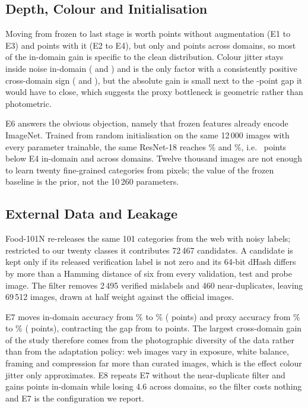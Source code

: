 \subsection{Depth, Colour and Initialisation}
Moving from frozen to last stage is worth \gainFinetuneNoaug{} points without
augmentation (E1 to E3) and \gainFinetuneAug{} points with it (E2 to E4), but
only \gainCanFinetuneNoaug{} and \gainCanFinetuneAug{} points across domains, so
most of the in-domain gain is specific to the clean distribution. Colour jitter
stays inside noise in-domain (\gainAugFrozen{} and \gainAugFinetune) and is the
only factor with a consistently positive cross-domain sign (\gainCanAugFrozen{}
and \gainCanAugFinetune), but the absolute gain is small next to the
\gapFour-point gap it would have to close, which suggests the proxy bottleneck is
geometric rather than photometric.

E6 answers the obvious objection, namely that frozen features already encode
ImageNet. Trained from random initialisation on the same 12\,000 images with every
parameter trainable, the same ResNet-18 reaches \accTestSix\% and \accCanSix\%,
i.e.\ \scratchDrop{} points below E4 in-domain and \scratchDropCan{} across
domains. Twelve thousand images are not enough to learn twenty fine-grained
categories from pixels; the value of the frozen baseline is the prior, not the
10\,260 parameters.

\subsection{External Data and Leakage}
Food-101N \cite{lee2018cleannet} re-releases the same 101 categories from the web
with noisy labels; restricted to our twenty classes it contributes 72\,467
candidates. A candidate is kept only if its released verification label is not
zero and its 64-bit dHash differs by more than a Hamming distance of six from
every validation, test and probe image. The filter removes 2\,495 verified
mislabels and 460 near-duplicates, leaving 69\,512 images, drawn at half weight
against the official images.

E7 moves in-domain accuracy from \accTestFour\% to \accTestSeven\%
(\gainExternal{} points) and proxy accuracy from \accCanFour\% to \accCanSeven\%
(\gainCanExternal{} points), contracting the gap from \gapFour{} to \gapSeven{}
points. The largest cross-domain gain of the study therefore comes from the
photographic diversity of the data rather than from the adaptation policy: web
images vary in exposure, white balance, framing and compression far more than
curated images, which is the effect colour jitter only approximates. E8 repeats
E7 without the near-duplicate filter and gains \leakTest{} points in-domain while
losing 4.6 across domains, so the filter costs nothing and E7 is the configuration
we report.

